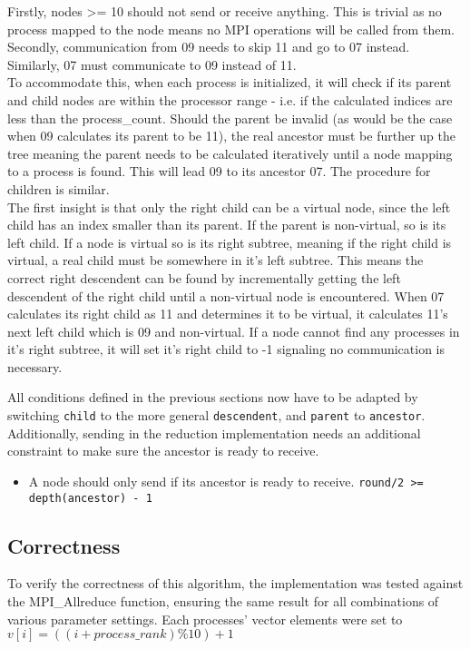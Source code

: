 \documentclass[twoside,twocolumn,hidelinks]{article}
\begin{document}
Firstly, nodes >= 10 should not send or receive anything. This is trivial as no process mapped to the node means no MPI operations will be called from them. Secondly, communication from 09 needs to skip 11 and go to 07 instead. Similarly, 07 must communicate to 09 instead of 11. \\
To accommodate this, when each process is initialized, it will check if its parent and child nodes are within the processor range - i.e. if the calculated indices are less than the process\_count. Should the parent be invalid (as would be the case when 09 calculates its parent to be 11), the real ancestor must be further up the tree meaning the parent needs to be calculated iteratively until a node mapping to a process is found. This will lead 09 to its ancestor 07. The procedure for children is similar. \\ The first insight is that only the right child can be a virtual node, since the left child has an index smaller than its parent. If the parent is non-virtual, so is its left child. If a node is virtual so is its right subtree, meaning if the right child is virtual, a real child must be somewhere in it's left subtree. This means the correct right descendent can be found by incrementally getting the left descendent of the right child until a non-virtual node is encountered. When 07 calculates its right child as 11 and determines it to be virtual, it calculates 11's next left child which is 09 and non-virtual. If a node cannot find any processes in it's right subtree, it will set it's right child to -1 signaling no communication is necessary.

All conditions defined in the previous sections now have to be adapted by switching \texttt{child} to the more general \texttt{descendent}, and \texttt{parent} to \texttt{ancestor}. Additionally, sending in the reduction implementation needs an additional constraint to make sure the ancestor is ready to receive.
\begin{itemize}
      \item A node should only send if its ancestor is ready to receive.
      \texttt{round/2 >= depth(ancestor) - 1}
\end{itemize}

\subsection{Correctness}
To verify the correctness of this algorithm, the implementation was tested against the MPI\_Allreduce function, ensuring the same result for all combinations of various parameter settings. Each processes' vector elements were set to $v[i] = ((i + process\_rank) \% 10) + 1$
\end{document}

